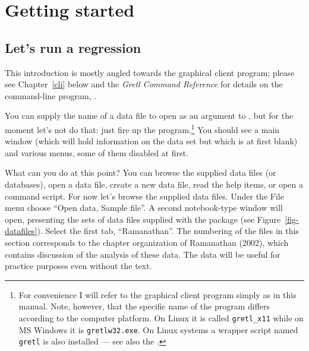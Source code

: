 \chapter{Getting started}
\label{getting-started}


\section{Let's run a regression}
\label{starting-regression}

This introduction is mostly angled towards the graphical client
program; please see Chapter~\ref{cli} below and the \emph{Gretl Command
  Reference} for details on the command-line program, .
    
You can supply the name of a data file to open as an argument to
, but for the moment let's not do that: just fire up the
program.\footnote{For convenience I will refer to the graphical client
  program simply as  in this manual. Note, however, that
  the specific name of the program differs according to the computer
  platform.  On Linux it is called \verb+gretl_x11+ while on MS
  Windows it is \verb+gretlw32.exe+. On Linux systems a wrapper script
  named \verb+gretl+ is also installed --- see also the \GCR.}  You
should see a main window (which will hold information on the data set
but which is at first blank) and various menus, some of them disabled
at first.
    
What can you do at this point?  You can browse the supplied data files
(or databases), open a data file, create a new data file, read the
help items, or open a command script.  For now let's browse the
supplied data files.  Under the File menu choose ``Open data, Sample
file''.  A second notebook-type window will open, presenting the sets
of data files supplied with the package (see
Figure~\ref{fig-datafiles}).  Select the first tab, ``Ramanathan''.
The numbering of the files in this section corresponds to the chapter
organization of Ramanathan (2002), which contains discussion of the
analysis of these data. The data will be useful for practice purposes
even without the text.
    
